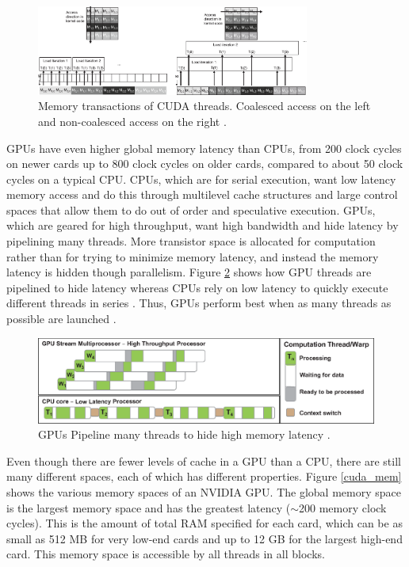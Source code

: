 \begin{figure}[h!] 
  \centering
    \includegraphics[width=0.8\textwidth]{graphics/coalesced.eps}
     \caption[Memory transactions of CUDA threads.]{Memory transactions of CUDA threads.  Coalesced access on the left and non-coalesced access on the right \cite{programming_massively}. \label{coalesced}}
\end{figure}

GPUs have even higher global memory latency than CPUs, from 200 clock cycles on newer cards up to 800 clock cycles on older cards, compared to about 50 clock cycles on a typical CPU.  CPUs, which are for serial execution, want low latency memory access and do this through multilevel cache structures and large control spaces that allow them to do out of order and speculative execution.  GPUs, which are geared for high throughput, want high bandwidth and hide latency by pipelining many threads.  More transistor space is allocated for computation rather than for trying to minimize memory latency, and instead the memory latency is hidden though parallelism.  Figure \ref{pipeline} shows how GPU threads are pipelined to hide latency whereas CPUs rely on low latency to quickly execute different threads in series \cite{cuda_gtc_pres}.  Thus, GPUs perform best when as many threads as possible are launched \cite{cuda}.

\begin{figure}[h!] 
  \centering
    \includegraphics[width=\textwidth]{graphics/pipeline.eps}
     \caption[GPUs Pipeline many threads to hide high memory latency.]{GPUs Pipeline many threads to hide high memory latency \cite{cuda_gtc_pres}. \label{pipeline}}
\end{figure}

Even though there are fewer levels of cache in a GPU than a CPU, there are still many different spaces, each of which has different properties.  Figure \ref{cuda_mem} shows the various memory spaces of an NVIDIA GPU.  The global memory space is the largest memory space and has the greatest latency ($\sim$200 memory clock cycles).  This is the amount of total RAM specified for each card, which can be as small as 512 MB for very low-end cards and up to 12 GB for the largest high-end card.  This memory space is accessible by all threads in all blocks.  

